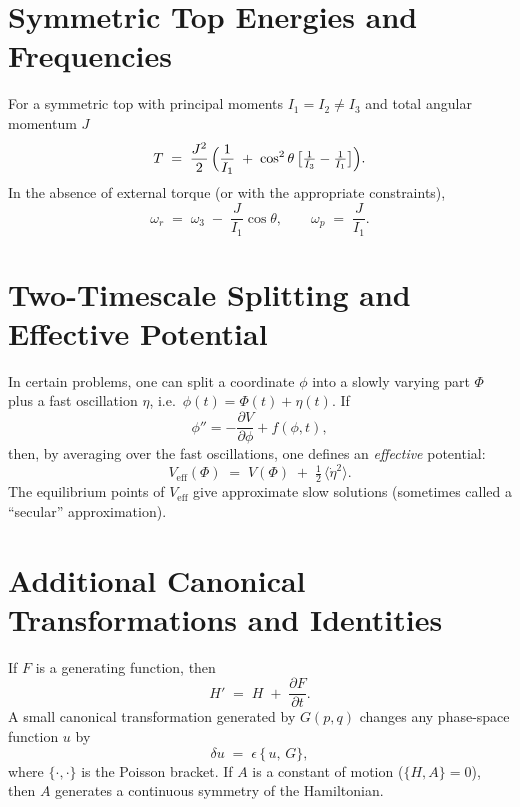 \documentclass[12pt]{article}
\begin{document}
\section*{Symmetric Top Energies and Frequencies}
For a symmetric top with principal moments $I_{1} = I_{2} \neq I_{3}$ and total angular momentum $J$
\begin{equation*}
    T
    \;=\;
    \frac{J^{2}}{2}\,
    \Bigl(\frac{1}{I_{1}}
          \;+\;
          \cos^{2}\theta\,
          \bigl[\tfrac{1}{I_{3}}-\tfrac{1}{I_{1}}\bigr]
    \Bigr).
\end{equation*}
In the absence of external torque (or with the appropriate constraints),
\begin{equation*}
    \omega_{r}
    \;=\;
    \omega_{3}
    \;-\;
    \frac{J}{I_{1}}\cos\theta,
    \qquad
    \omega_{p}
    \;=\;
    \frac{J}{I_{1}}.
\end{equation*}

\section*{Two-Timescale Splitting and Effective Potential}
In certain problems, one can split a coordinate $\phi$ into a slowly varying part $\Phi$ plus a fast oscillation $\eta$, i.e.\ $\phi(t) = \Phi(t) + \eta(t).$
If
\[
\phi'' = -\frac{\partial V}{\partial \phi} + f(\phi,t),
\]
then, by averaging over the fast oscillations, one defines an \emph{effective} potential:
\begin{equation*}
    V_{\text{eff}}(\Phi)
    \;=\;
    V(\Phi)
    \;+\;
    \tfrac{1}{2}\,\bigl\langle \dot{\eta}^{2}\bigr\rangle.
\end{equation*}
The equilibrium points of $V_{\text{eff}}$ give approximate slow solutions (sometimes called a “secular” approximation).

\section*{Additional Canonical Transformations and Identities}
If $F$ is a generating function, then
\begin{equation*}
    H' \;=\; H \;+\; \frac{\partial F}{\partial t}.
\end{equation*}
A small canonical transformation generated by $G(p,q)$ changes any phase-space function $u$ by
\begin{equation*}
    \delta u
    \;=\;
    \epsilon\,\{\,u,\,G\},
\end{equation*}
where $\{\cdot,\cdot\}$ is the Poisson bracket.  If $A$ is a constant of motion ($\{H,A\}=0$), then $A$ generates a continuous symmetry of the Hamiltonian.
\end{document}
